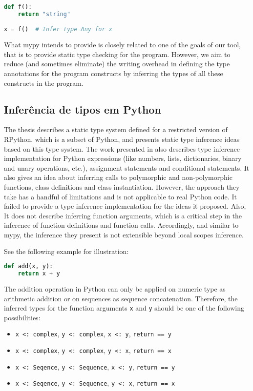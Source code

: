 \begin{lstlisting}[language=Python]
def f():
	return "string"

x = f()  # Infer type Any for x
\end{lstlisting}

What mypy intends to provide is closely related to one of the goals of our tool, that is to provide static type checking for the program. However, we aim to reduce (and sometimes eliminate) the writing overhead in defining the type annotations for the program constructs by inferring the types of all these constructs in the program.


\subsection{Inferência de tipos em Python \cite{porto}}
The thesis \cite{porto} describes a static type system defined for a restricted version of RPython, which is a subset of Python, and presents static type inference ideas based on this type system. The work presented in \cite{porto} also describes type inference implementation for Python expressions (like numbers, lists, dictionaries, binary and
unary operations, etc.), assignment statements and conditional statements. It also gives an idea about inferring calls to polymorphic and non-polymorphic functions, class definitions and class instantiation. However, the approach they take has a handful of limitations and is not applicable to real Python code. It failed to provide a type inference implementation for the ideas it proposed. Also, It does not describe inferring function arguments, which is a critical step in the inference of function definitions and function calls. Accordingly, and similar to mypy, the inference they present is not extensible beyond local scopes inference.

See the following example for illustration:

\begin{lstlisting}[language=Python]
def add(x, y):
	return x + y
\end{lstlisting}

The addition operation in Python can only be applied on numeric type as arithmetic addition or on sequences as sequence concatenation. Therefore, the inferred types for the function arguments \lstinline|x| and \lstinline|y| should be one of the following possibilities:
\begin{itemize}
	\item \lstinline|x <: complex|, \lstinline|y <: complex|, \lstinline|x <: y|, \lstinline|return == y|
	\item \lstinline|x <: complex|, \lstinline|y <: complex|, \lstinline|y <: x|, \lstinline|return == x|
	\item \lstinline|x <: Seqence|, \lstinline|y <: Sequence|, \lstinline|x <: y|, \lstinline|return == y|
	\item \lstinline|x <: Seqence|, \lstinline|y <: Sequence|, \lstinline|y <: x|, \lstinline|return == x|
\end{itemize}

